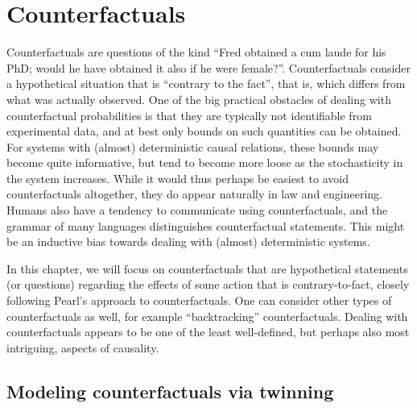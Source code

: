 \section{Counterfactuals}

Counterfactuals are questions of the kind ``Fred obtained a cum laude for his PhD; would he have obtained it also if he were female?''.
Counterfactuals consider a hypothetical situation that is ``contrary to the fact'', that is, which differs from what was actually observed.
One of the big practical obstacles of dealing with counterfactual probabilities is that they are typically not identifiable from experimental data, and at best only bounds on such quantities can be obtained.
For systems with (almost) deterministic causal relations, these bounds may become quite informative, but tend to become more loose as the stochasticity in the system increases.
While it would thus perhaps be easiest to avoid counterfactuals altogether, they do appear naturally in law and engineering.
Humans also have a tendency to communicate using counterfactuals, and the grammar of many languages distinguishes 
counterfactual statements. This might be an inductive bias towards dealing with (almost) deterministic systems.

In this chapter, we will focus on counterfactuals that are hypothetical
statements (or questions) regarding the effects of some action that is
contrary-to-fact, closely following Pearl's approach to counterfactuals. 
One can consider other types of counterfactuals as well, for example 
``backtracking'' counterfactuals. Dealing with counterfactuals appears to
be one of the least well-defined, but perhaps also most intriguing, aspects
of causality.

\subsection{Modeling counterfactuals via twinning}\label{sec:counterfactuals}

